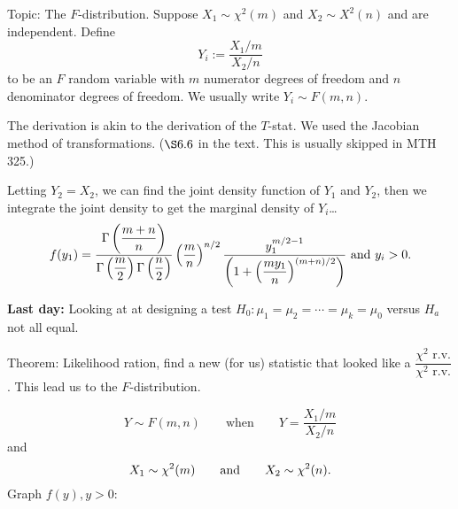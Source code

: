 \nnl Topic: The $F$-distribution. Suppose $X_1 \sim \chi^2(m)$ and $X_2 \sim X^2(n)$ and are independent. Define
$$Y_i := \frac{X_1\big/  m}{X_2 \big/ n}$$
to be an $F$ random variable with $m$ numerator degrees of freedom and $n$ denominator degrees of freedom. We usually write $Y_i \sim F(m,n)$.

\nl The derivation is akin to the derivation of the $T$-stat. We used the Jacobian method of transformations. ($\S6.6$ in the text. This is usually skipped in MTH 325.)

\nl Letting $Y_2 = X_2$, we can find the joint density function of $Y_1$ and $Y_2$, then we integrate the joint density to get the marginal density of $Y_i$\dots
$$
    f(y_1) = \dfrac{
        \Gamma \pfrac*{m+n}{n}
    }{
        \Gamma \pfrac*{m}{2} \Gamma \pfrac*{n}{2}
    } \pfrac{m}{n}^{n/2}
    \frac{
        y_1^{m/2 -1}
    }
    {
        \pars{1 + \pfrac*{my_1}{n}^{(m+n)/2}}
    } \text{ and } y_i > 0.
$$

\nl \textbf{Last day:} Looking at at designing a test $H_0 : \mu_1 = \mu_2 = \cdots = \mu_k = \mu_0$ versus $H_a$ not all equal.

\nl Theorem: Likelihood ration, find a new (for us) statistic that looked like a $\dfrac{\chi^2 \text{ r.v.}}{\chi^2 \text{ r.v.}}$. This lead us to the $F$-distribution.

$$Y \sim F(m,n) \qquad \text{when} \qquad Y = \frac{X_1/m}{X_2/n}$$
and
$$X_1 \sim \chi^2(m) \qquad \text{and} \qquad X_2 \sim \chi^2(n).$$
Graph $f(y), y >0$:

